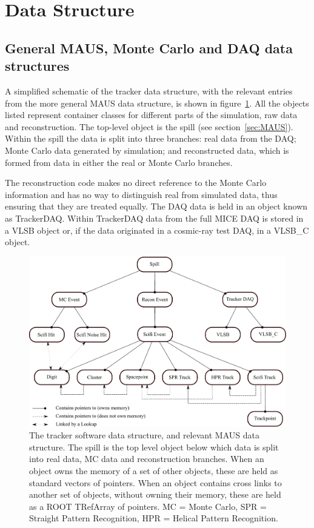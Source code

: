 \section{Data Structure}
\label{sec:DataStructure}

\subsection{General MAUS, Monte Carlo and DAQ data structures}
\label{subsec:GeneralDataStructure}
A simplified schematic of the tracker data structure, with the relevant entries from the more general MAUS data structure, is shown in figure~\ref{figureDataStructure}.  All the objects listed represent container classes for different parts of the simulation, raw data and reconstruction.  The top-level object is the spill (see section~\ref{sec:MAUS}).  Within the spill the data is split into three branches: real data from the DAQ; Monte Carlo data generated by simulation; and reconstructed data, which is formed from data in either the real or Monte Carlo branches. 

The reconstruction code makes no direct reference to the Monte Carlo information and has no way to distinguish real from simulated data, thus ensuring that they are treated equally.  The DAQ data is held in an object known as TrackerDAQ.  Within TrackerDAQ data from the full MICE DAQ is stored in a VLSB object or, if the data originated in a cosmic-ray test DAQ, in a VLSB\_C object.

\begin{figure}[bt]
  \begin{center}
    \includegraphics[width=27pc]{04-DataStructure/DataStructureSimple2016.pdf}
    \caption{\label{figureDataStructure}The tracker software data structure, and relevant MAUS data structure.  The spill is the top level object below which data is split into real data, MC data and reconstruction branches. When an object owns the memory of a set of other objects, these are held as standard vectors of pointers. When an object contains cross links to another set of objects, without owning their memory, these are held as a ROOT TRefArray of pointers. MC = Monte Carlo, SPR = Straight Pattern Recognition, HPR = Helical Pattern Recognition.}
  \end{center}
\end{figure}

